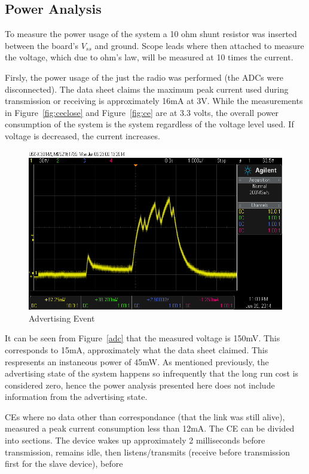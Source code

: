 \documentclass[]{article}
\begin{document}
\subsection{Power Analysis}

To measure the power usage of the system a 10 ohm shunt resistor was inserted between the board's $V_{ss}$ and ground. Scope leads where then attached to measure the voltage, which due to ohm's law, will be measured at 10 times the current. 

Firsly, the power usage of the just the radio was performed (the ADCs were disconnected).  The data sheet claims the maximum peak current used during transmission or receiving is approximately 16mA at 3V. While the measurements in Figure~\ref{fig:ceclose} and Figure~\ref{fig:ce} are at 3.3 volts, the overall power consumption of the system is the system regardless of the voltage level used. If voltage is decreased, the current increases.

\begin{figure}[htb]
	\begin{center}
		\includegraphics[width = \textwidth]{adv}
	\end{center}
	\caption{Advertising Event}
	\label{fig:adv}
\end{figure}

It can be seen from Figure~\ref{adc} that the measured voltage is 150mV. This corresponds to 15mA, approximately what the data sheet claimed. This respresents an instaneous power of 45mW. As mentioned previously, the advertising state of the system happens so infrequently that the long run cost is considered zero, hence the power analysis presented here does not include information from the advertising state.

\ac{CE}s where no data other than correspondance (that the link was still alive), measured a peak current consumption less than 12mA. The \ac{CE} can be divided into sections. The device wakes up approximately 2 milliseconds before transmission, remains idle, then listens/transmits (receive before transmission first for the slave device), before 
\end{document}

